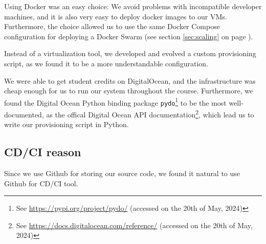 Using Docker was an easy choice: We avoid problems with incompatible developer machines, and it is also very easy to deploy docker images to our VMs. Furthermore,
the choice allowed us to use the same Docker Compose configuration for deploying a Docker Swarm (see section \ref{sec:scaling} on page \pageref{sec:scaling}).

Instead of a virtualization tool, we developed and evolved a custom provisioning script, as we found it to be a more understandable configuration.%


We were able to get student credits on DigitalOcean, and the infrastructure was cheap enough for us to run our system throughout the course.
Furthermore, we found the Digital Ocean Python binding package \texttt{pydo}\footnote{See \url{https://pypi.org/project/pydo/} (accessed on the 20th of May, 2024)} to be the most well-documented, as the offical Digital Ocean API documentation\footnote{See \url{https://docs.digitalocean.com/reference/} (accessed on the 20th of May, 2024)}, which lead us to write our provisioning script in Python.


\subsection{CD/CI reason}
Since we use Github for storing our source code, we found it natural to use Github for CD/CI tool.%

